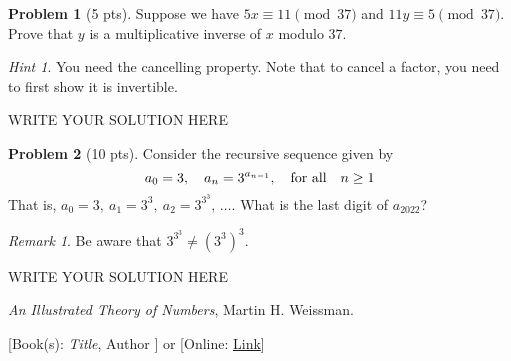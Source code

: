 \documentclass[11pt]{article}
\theoremstyle{plain}
\theoremstyle{definition}
\newtheorem{problem}{Problem}
\theoremstyle{remark}
\newtheorem*{remark}{Remark}
\newtheorem*{hint}{Hint}
\numberwithin{equation}{problem}
\begin{document}
\begin{problem}[5 pts]
	Suppose we have $5x \equiv 11\pmod{37}$ and $11y \equiv 5\pmod{37}$. Prove that $y$ is a multiplicative inverse of $x$ modulo $37$.  
	\begin{hint}
		You need the cancelling property. Note that to cancel a factor, you need to first show it is invertible.
	\end{hint}
\end{problem}
\begin{solution} %
WRITE YOUR SOLUTION HERE
\end{solution}\clearpage %



\begin{problem}[10 pts]
	Consider the recursive sequence given by 
	\[
		a_0 = 3,\quad a_n = 3^{a_{n-1}},\quad\text{for all}\quad{n\geq 1}
	\]
	That is, $a_0 = 3,\ a_1 = 3^3,\ a_2 = 3^{3^3},\,\ldots$. What is the last digit of $a_{2022}$?
	\begin{remark}
		Be aware that $3^{3^3} \neq (3^3)^3$.
	\end{remark}
\end{problem}
\begin{solution} %
WRITE YOUR SOLUTION HERE
\end{solution}\clearpage %



\begin{thebibliography}{9}  %
\emph{An Illustrated Theory of Numbers}, Martin H. Weissman.

[Book(s): \emph{Title}, Author ] or [Online: \href{http://example.com/}{Link}]
\end{thebibliography}  %
\end{document}
